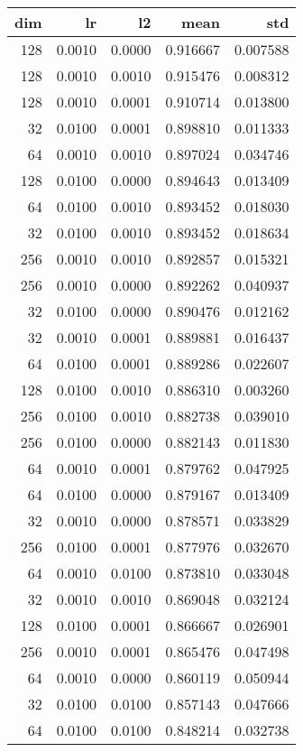 \begin{tabular}{rrrrr}
\toprule
 dim &      lr &      l2 &      mean &       std \\
\midrule
 128 &  0.0010 &  0.0000 &  0.916667 &  0.007588 \\
 128 &  0.0010 &  0.0010 &  0.915476 &  0.008312 \\
 128 &  0.0010 &  0.0001 &  0.910714 &  0.013800 \\
  32 &  0.0100 &  0.0001 &  0.898810 &  0.011333 \\
  64 &  0.0010 &  0.0010 &  0.897024 &  0.034746 \\
 128 &  0.0100 &  0.0000 &  0.894643 &  0.013409 \\
  64 &  0.0100 &  0.0010 &  0.893452 &  0.018030 \\
  32 &  0.0100 &  0.0010 &  0.893452 &  0.018634 \\
 256 &  0.0010 &  0.0010 &  0.892857 &  0.015321 \\
 256 &  0.0010 &  0.0000 &  0.892262 &  0.040937 \\
  32 &  0.0100 &  0.0000 &  0.890476 &  0.012162 \\
  32 &  0.0010 &  0.0001 &  0.889881 &  0.016437 \\
  64 &  0.0100 &  0.0001 &  0.889286 &  0.022607 \\
 128 &  0.0100 &  0.0010 &  0.886310 &  0.003260 \\
 256 &  0.0100 &  0.0010 &  0.882738 &  0.039010 \\
 256 &  0.0100 &  0.0000 &  0.882143 &  0.011830 \\
  64 &  0.0010 &  0.0001 &  0.879762 &  0.047925 \\
  64 &  0.0100 &  0.0000 &  0.879167 &  0.013409 \\
  32 &  0.0010 &  0.0000 &  0.878571 &  0.033829 \\
 256 &  0.0100 &  0.0001 &  0.877976 &  0.032670 \\
  64 &  0.0010 &  0.0100 &  0.873810 &  0.033048 \\
  32 &  0.0010 &  0.0010 &  0.869048 &  0.032124 \\
 128 &  0.0100 &  0.0001 &  0.866667 &  0.026901 \\
 256 &  0.0010 &  0.0001 &  0.865476 &  0.047498 \\
  64 &  0.0010 &  0.0000 &  0.860119 &  0.050944 \\
  32 &  0.0100 &  0.0100 &  0.857143 &  0.047666 \\
  64 &  0.0100 &  0.0100 &  0.848214 &  0.032738 \\

\end{tabular}
